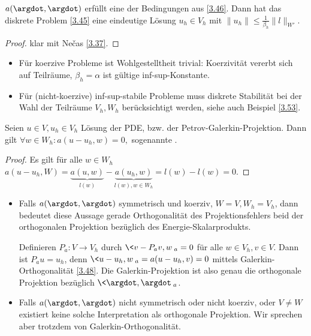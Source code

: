 \begin{st}[Wohlgestelltheit] \label{3.47}
	$a(\argdot, \argdot)$ erfüllt eine der Bedingungen aus \ref{3.46}.
	Dann hat das diskrete Problem \ref{3.45} eine eindeutige Lösung $u_h \in V_h$ mit
	\begin{math}
		\|u_h\| \le \frac{1}{\beta_h} \|l\|_{W'}.
	\end{math}
	\begin{proof}
		klar mit Nečas \ref{3.37}.
	\end{proof}
	\begin{note}
		\begin{itemize}
			\item
				Für koerzive Probleme ist Wohlgestelltheit trivial:
				Koerzivität vererbt sich auf Teilräume, $\beta_h = \alpha$ ist gültige inf-sup-Konstante.
			\item
				Für (nicht-koerzive) inf-sup-stabile Probleme muss diskrete Stabilität bei der Wahl der Teilräume $V_h, W_h$ berücksichtigt werden, siehe auch Beispiel \ref{3.53}.
		\end{itemize}
	\end{note}
\end{st}

\begin{lem} \label{3.48}
	Seien $u \in V, u_h \in V_h$ Lösung der PDE, bzw. der Petrov-Galerkin-Projektion.
	Dann gilt
	\begin{math}
		\forall w \in W_h : a(u - u_h, w) = 0,
	\end{math}
	sogenannte .
	\begin{proof}
		Es gilt für alle $w \in W_h$
		\begin{math}
			a(u-u_h, W)
			= \underbrace{a(u, w)}_{l(w)} - \underbrace{a(u_h, w)}_{l(w), w \in W_h}
			= l(w) - l(w)
			= 0.
		\end{math}
	\end{proof}
	\begin{note}
		\begin{itemize}
			\item
				Falls $a(\argdot, \argdot)$ symmetrisch und koerziv, $W = V, W_h = V_h$, dann bedeutet diese Aussage gerade Orthogonalität des Projektionsfehlers beid der orthogonalen Projektion bezüglich des Energie-Skalarprodukts.

				Definieren $P_a: V \to V_h$ durch $\<v - P_a v, w\>_a = 0$ für alle $w \in V_h, v \in V$.
				Dann ist $P_a u = u_h$, denn $\<u - u_h, w\>_a = a(u - u_h, v) = 0$ mittels Galerkin-Orthogonalität \ref{3.48}.
				Die Galerkin-Projektion ist also genau die orthogonale Projektion bezüglich $\<\argdot, \argdot\>_a$.
			\item
				Falls $a(\argdot, \argdot)$ nicht symmetrisch oder nicht koerziv, oder $V \neq W$ existiert keine solche Interpretation als orthogonale Projektion.
				Wir sprechen aber trotzdem von Galerkin-Orthogonalität.
		\end{itemize}
	\end{note}
\end{lem}



